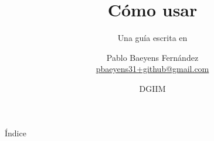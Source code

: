\documentclass[compress, aspectratio=43]{beamer}
\title{Cómo usar \beamer}                                               %
\subtitle{Una guía escrita en \beamer}                                  %
\author[Pablo Baeyens]{ %
Pablo Baeyens Fernández \\
\href{mailto:pbaeyens31+github@gmail.com}{pbaeyens31+github@gmail.com}} %
\date{DGIIM}                                                            %
\newcommand{\seccion}[1]{}           %
\begin{document}
\begin{frame}
\titlepage
\end{frame}

\begin{frame}{Índice}
  \hypertarget{index}{}
  \tableofcontents
\end{frame}

\seccion{intro.tex}       %
\seccion{estructura.tex}  %
\seccion{aspecto.tex}     %
\seccion{otros.tex}       %
\seccion{enlaces.tex}     %
\end{document}
